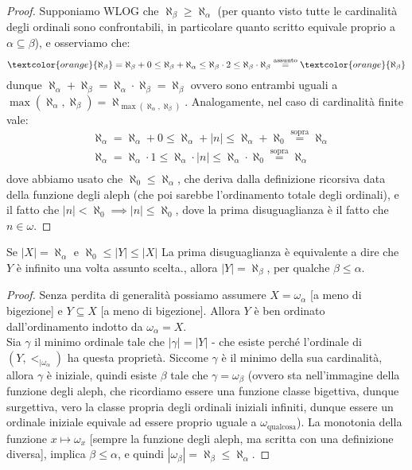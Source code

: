 \documentclass[11pt]{scrartcl}
\begin{document}
\begin{proof}
	Supponiamo WLOG che $\aleph_\beta \geq \aleph_\alpha$ (per quanto visto tutte le cardinalità degli ordinali sono confrontabili, in particolare quanto scritto equivale proprio a $\alpha \subseteq \beta$), e osserviamo che:
	\[ \textcolor{orange}{\aleph_\beta} = \aleph_\beta + 0 \leq \aleph_\beta + \aleph_\alpha \leq \aleph_\beta \cdot 2 \leq \aleph_\beta \cdot \aleph_\beta \overset{\text{assunto}}{=} \textcolor{orange}{\aleph_\beta}
		\]
	dunque $\aleph_\alpha + \aleph_\beta = \aleph_\alpha \cdot\aleph_\beta = \aleph_\beta$ ovvero sono entrambi uguali a $ \max(\aleph_\alpha,\aleph_\beta) = \aleph_{\max(\aleph_\alpha,\aleph_\beta)}$.
	Analogamente, nel caso di cardinalità finite vale:
	\begin{align*}
		&\aleph_\alpha = \aleph_\alpha + 0 \leq \aleph_\alpha + |n| \leq \aleph_\alpha + \aleph_0 \overset{\text{sopra}}{=} \aleph_\alpha \\
		&\aleph_\alpha = \aleph_\alpha \cdot 1 \leq \aleph_\alpha \cdot |n| \leq \aleph_\alpha \cdot \aleph_0 \overset{\text{sopra}}{=} \aleph_\alpha \\
	\end{align*}
	dove abbiamo usato che $\aleph_0 \leq \aleph_\alpha$, che deriva dalla definizione ricorsiva data della funzione degli aleph (che poi sarebbe l'ordinamento totale degli ordinali), e il fatto che $|n| < \aleph_0 \implies |n| \leq \aleph_0$, dove la prima disuguaglianza è il fatto che $n \in \omega$.
\end{proof}

\begin{remark}
	Se $|X| = \aleph_\alpha$ e $\aleph_0 \leq |Y| \leq |X|$ {La prima disuguaglianza è equivalente a dire che $Y$ è infinito una volta assunto scelta.}, allora $|Y| = \aleph_\beta$, per qualche $\beta \leq \alpha$.
\end{remark}

\begin{proof}
	Senza perdita di generalità possiamo assumere $X = \omega_\alpha$ [a meno di bigezione] e $Y \subseteq X$ [a meno di bigezione]. Allora $Y$ è ben ordinato dall'ordinamento indotto da $\omega_\alpha = X$.\\
	Sia $\gamma$ il minimo ordinale tale che $|\gamma| = |Y|$ - che esiste perché l'ordinale di $(Y,<_{|\omega_\alpha})$ ha questa proprietà. Siccome $\gamma$ è il minimo della sua cardinalità, allora $\gamma$ è iniziale, quindi esiste $\beta$ tale che $\gamma = \omega_\beta$ (ovvero sta nell'immagine della funzione
	degli aleph, che ricordiamo essere una funzione classe bigettiva, dunque surgettiva, vero la classe propria degli ordinali iniziali infiniti, dunque essere un ordinale iniziale equivale ad essere proprio uguale a $\omega_{\text{qualcosa}}$). La monotonia della funzione $x \mapsto \omega_x$ [sempre la funzione degli aleph, ma scritta con una definizione diversa], implica $\beta \leq \alpha$,
	e quindi $|\omega_\beta| = \aleph_\beta \leq \aleph_\alpha$.
\end{proof}
\end{document}
